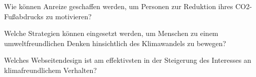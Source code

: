 \item Wie können Anreize geschaffen werden, um Personen zur Reduktion ihres CO2-Fußabdrucks zu motivieren?

\item Welche Strategien können eingesetzt werden, um Menschen zu einem umweltfreundlichen Denken hinsichtlich des Klimawandels zu bewegen?

\item Welches Webseitendesign ist am effektivsten in der Steigerung des Interesses an klimafreundlichem Verhalten?
